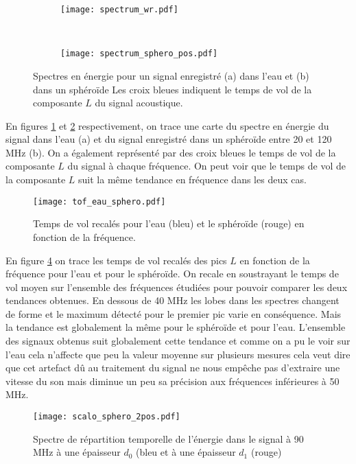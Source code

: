 \begin{figure}[ht!]
\centering
\begin{subfigure}[t]{0.45\textwidth}
\texttt{[image: spectrum\_wr.pdf]}
\caption{\label{spectrum_tvol_eau}}
\end{subfigure}
~
\begin{subfigure}[t]{0.45\textwidth}
\texttt{[image: spectrum\_sphero\_pos.pdf]}
\caption{\label{spectrum_tvol_sphero}}
\end{subfigure}
\caption{ Spectres en énergie pour un signal enregistré (a) dans l'eau  et (b) dans un sphéroïde  \label{spectrum_tvol} Les croix bleues indiquent le temps de vol de la composante $L$ du signal acoustique.}
\end{figure}
En figures \ref{spectrum_tvol_eau} et \ref{spectrum_tvol_sphero} respectivement,  on trace  une carte du spectre en énergie du signal dans l'eau (a) et du signal enregistré dans un sphéroïde entre 20 et 120 MHz (b).  On a également représenté par des croix bleues le temps de vol de la composante $L$ du signal à chaque fréquence. On peut voir que le temps de vol de la composante $L$ suit la même tendance en fréquence dans les deux cas. 
\begin{figure}[ht!]
\centering
\texttt{[image: tof\_eau\_sphero.pdf]}
\caption{Temps de vol recalés pour l'eau (bleu) et le sphéroïde (rouge) en fonction de la fréquence.\label{tvol_freq}}
\end{figure}
En figure \ref{tvol_freq} on trace les temps de vol recalés des pics $L$  en fonction de la fréquence pour l'eau et pour le sphéroïde. On recale en soustrayant le temps de vol moyen sur l'ensemble des fréquences étudiées pour pouvoir comparer les deux tendances obtenues. En dessous de  40 MHz les lobes dans les spectres changent de forme et le maximum détecté pour le premier pic varie en conséquence. Mais la tendance est globalement la même pour le sphéroïde et pour l'eau. L'ensemble des signaux obtenus suit globalement cette tendance et  comme on a pu le voir sur l'eau cela n'affecte que peu la valeur moyenne sur plusieurs mesures cela veut dire que cet artefact dû au traitement du signal ne nous empêche pas d'extraire une vitesse du son mais diminue un peu sa précision aux fréquences inférieures à 50 MHz.
\begin{figure}[ht!]
\centering
\texttt{[image: scalo\_sphero\_2pos.pdf]}
\caption{Spectre de répartition temporelle de l'énergie dans le signal à 90 MHz à une épaisseur $d_0$ (bleu et  à une épaisseur $d_1$ (rouge) \label{scalo_sphero_2pos}}
\end{figure}

